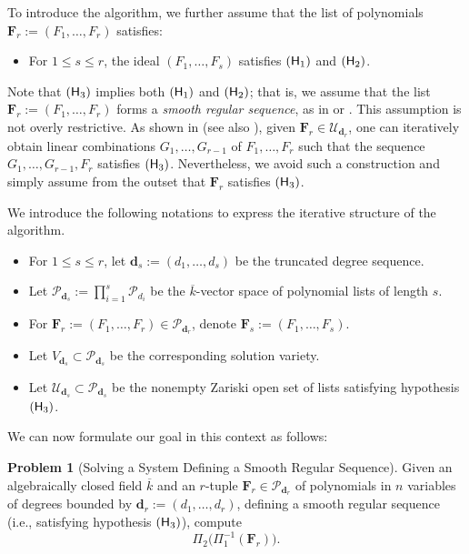 \documentclass[pdflatex,sn-basic]{sn-jnl}%
\theoremstyle{thmstyleone}%
\theoremstyle{thmstyletwo}%
\theoremstyle{thmstylethree}%
\theoremstyle{definition}
\newtheorem{problem}[theorem]{Problem}
\numberwithin{equation}{section}
\newcommand{\bfs}{\boldsymbol}
\begin{document}
To introduce the algorithm, we further assume that the list of
polynomials $\bfs F_r:=(F_1,\ldots,F_r)$ satisfies:
%
\begin{itemize}
  \item[$({\sf H}_3)$]  For $1\le s\le r$, the ideal $(F_1,\ldots,F_s)$ satisfies
 $({\sf H}_1)$ and $({\sf H}_2)$.
\end{itemize}
%
Note that $({\sf H}_3)$ implies both $({\sf H}_1)$ and $({\sf
H}_2)$; that is, we assume that the list $\bfs
F_r:=(F_1,\ldots,F_r)$ forms a {\em smooth regular sequence}, as in
\cite{GiHeMoPa95} or \cite{Pardo95}. This assumption is not overly
restrictive. As shown in \cite{KrPa96} (see also
\cite{Jouanolou83}), given $\bfs F_r\in\mathcal{U}_{\bfs d_r}$, one
can iteratively  obtain linear combinations $G_1,\ldots,G_{r-1}$ of
$F_1,\ldots,F_r$ such that the sequence $G_1,\ldots,G_{r-1},F_r$
satisfies $({\sf H}_3)$. Nevertheless, we avoid such a construction
and simply assume from the outset that  $\bfs F_r$ satisfies $({\sf
H}_3)$.

We introduce the following notations to express the iterative
structure of the algorithm.
%
\begin{itemize}
  \item For $1\le s\le r$, let $\bfs d_s:=(d_1,\ldots,d_s)$
  be the truncated degree sequence.
  \item Let $\mathcal{P}_{\bfs d_s}:=\prod_{i=1}^s
  \mathcal{P}_{d_i}$ be
  the $\overline{k}$-vector space of polynomial lists  of length
  $s$.
  \item For $\bfs F_r:=(F_1,\ldots,F_r)\in\mathcal{P}_{\bfs d_r}$,
  denote $\bfs F_s:=(F_1,\ldots,F_s)$.
  \item Let $V_{\bfs d_s}\subset\mathcal{P}_{\bfs d_s}$ be the
  corresponding solution variety.
  \item Let $\mathcal{U}_{\bfs d_s}\subset\mathcal{P}_{\bfs d_s}$ be the nonempty
  Zariski open set of lists satisfying hypothesis
  $({\sf H}_3)$.
\end{itemize}

We can now formulate our goal in this context as follows:
%
\begin{problem}[Solving a System Defining a Smooth Regular Sequence]
Given an algebraically closed field $\overline{k}$ and an $r$-tuple
$\bfs F_r\in\mathcal{P}_{\bfs d_r}$ of polynomials in $n$ variables
of degrees bounded by $\bfs d_r:=(d_1,\ldots,d_r)$, defining a
smooth regular sequence (i.e., satisfying hypothesis $({\sf H}_3)$),
compute $$\Pi_2\big(\Pi_1^{-1}(\bfs F_r)\big).$$
\end{problem}
\end{document}
